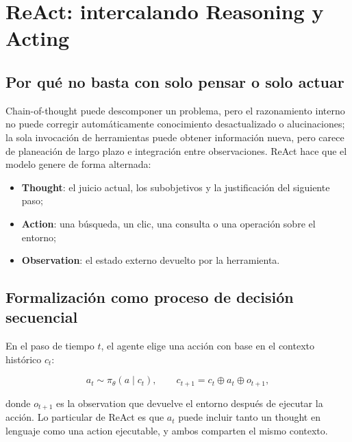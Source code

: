 \section{ReAct: intercalando Reasoning y Acting}

\subsection{Por qué no basta con solo pensar o solo actuar}

Chain-of-thought puede descomponer un problema, pero el razonamiento interno no puede corregir automáticamente conocimiento desactualizado o alucinaciones; la sola invocación de herramientas puede obtener información nueva, pero carece de planeación de largo plazo e integración entre observaciones. ReAct hace que el modelo genere de forma alternada:

\begin{itemize}
    \item \textbf{Thought}: el juicio actual, los subobjetivos y la justificación del siguiente paso;
    \item \textbf{Action}: una búsqueda, un clic, una consulta o una operación sobre el entorno;
    \item \textbf{Observation}: el estado externo devuelto por la herramienta.
\end{itemize}



\subsection{Formalización como proceso de decisión secuencial}

En el paso de tiempo $t$, el agente elige una acción con base en el contexto histórico $c_t$:

$$
a_t\sim\pi_\theta(a\mid c_t),\qquad
c_{t+1}=c_t\oplus a_t\oplus o_{t+1},
$$

donde $o_{t+1}$ es la observation que devuelve el entorno después de ejecutar la acción. Lo particular de ReAct es que $a_t$ puede incluir tanto un thought en lenguaje como una action ejecutable, y ambos comparten el mismo contexto.

